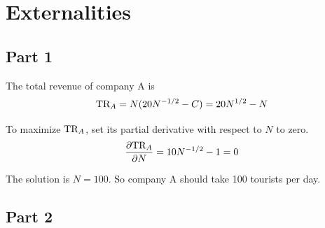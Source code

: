 \documentclass{article}
\begin{document}
\section{Externalities}
\subsection{Part 1}
The total revenue of company A is
\begin{equation*}
\textup{TR}_A=N(20N^{-1/2}-C)=20N^{1/2}-N
\end{equation*}

To maximize $\textup{TR}_A$, set its partial derivative with respect to $N$ to zero.
\begin{equation*}
\frac{\partial\textup{TR}_A}{\partial N}=10N^{-1/2}-1=0
\end{equation*}

The solution is $N=100$. So company A should take 100 tourists per day.

\subsection{Part 2}
\end{document}
